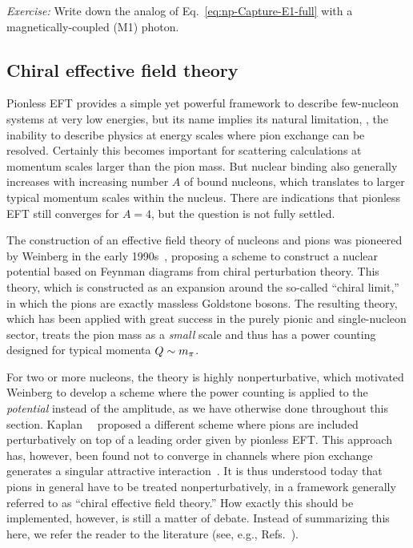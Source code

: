 \begin{prob}
\emph{Exercise:} Write down the analog of Eq.~\eqref{eq:np-Capture-E1-full} 
with a magnetically-coupled (M1) photon.
\end{prob}


\subsection{Chiral effective field theory}
\label{sec:EFT-Chiral}

Pionless EFT provides a simple yet powerful framework to describe few-nucleon 
systems at very low energies, but its name implies its natural limitation, \ie, 
the inability to describe physics at energy scales where pion exchange can be 
resolved.  Certainly this becomes important for scattering calculations at 
momentum scales larger than the pion mass.  But nuclear binding also 
generally increases with increasing number $A$ of bound nucleons, which 
translates to larger typical momentum scales within the nucleus.  There are 
indications that pionless EFT still converges for $A=4$, but the question is 
not fully settled.

The construction of an effective field theory of nucleons and pions was 
pioneered by Weinberg in the early 1990s~\cite{Weinberg:1990rz,Weinberg:1991um},
proposing a scheme to construct a nuclear potential based on Feynman diagrams 
from chiral perturbation theory.  This theory, which is constructed as an 
expansion around the so-called ``chiral limit,'' in which the pions are exactly 
massless Goldstone bosons.  The resulting theory, which has been applied with 
great success in the purely pionic and single-nucleon sector, treats the pion 
mass as a \emph{small} scale and thus has a power counting designed for typical 
momenta $Q\sim m_\pi$.

For two or more nucleons, the theory is highly nonperturbative, which motivated 
Weinberg to develop a scheme where the power counting is applied to the 
\emph{potential} instead of the amplitude, as we have otherwise done throughout 
this section.  Kaplan~\etal~\cite{Kaplan:1996xu,Kaplan:1998we,Kaplan:1998tg} 
proposed a different scheme where pions are included perturbatively on top of a 
leading order given by pionless EFT.  This approach has, however, been found not 
to converge in channels where pion exchange generates a singular attractive 
interaction~\cite{Fleming:1999ee}.  It is thus understood today that pions in
general have to be treated nonperturbatively, in a framework generally referred 
to as ``chiral effective field theory.''  How exactly this should be 
implemented, however, is still a matter of debate.  Instead of summarizing this 
here, we refer the reader to the 
literature (see, e.g., Refs.~\cite{Beane:2000fx,Bedaque:2002mn,Nogga:2005hy,
Birse:2005um,Epelbaum:2008ga,Machleidt:2011zz,Epelbaum:2006pt,Hammer:2012id,
Long:2016vnq}).

